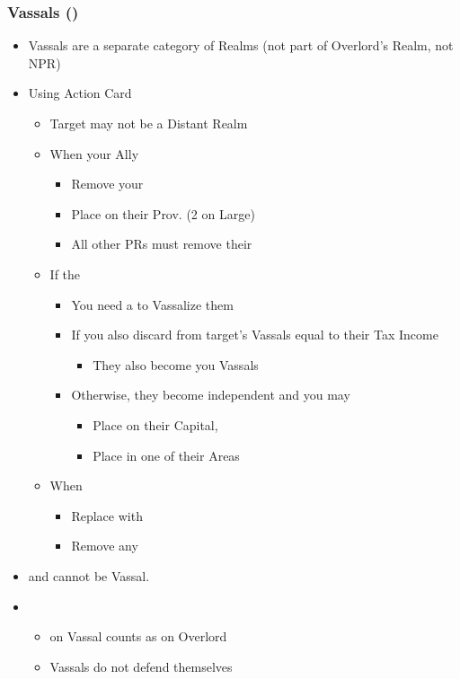 \documentclass[10pt]{article}
\begin{document}
\subsubsection*{Vassals (\vassal)}
\begin{itemize}
	\item Vassals are a separate category of Realms (not part of Overlord's Realm, not NPR)
	\item Using  Action Card
	\begin{itemize}
		\item Target may not be a Distant Realm
		\item When  your Ally
		\begin{itemize}
			\item Remove your \alliance
			\item Place \vassals on their Prov. (2 on Large)
			\item All other PRs must remove their \marriages
		\end{itemize}
		\item If the 
		\begin{itemize}
			\item You need a \marriage to Vassalize them
			\item If you also discard \influence from target's Vassals equal to their Tax Income
			\begin{itemize}
				\item They also become you Vassals
			\end{itemize}
			\item Otherwise, they become independent and you may
			\begin{itemize}
				\item Place \alliance on their Capital, 
				\item Place \claim in one of their Areas
			\end{itemize}
		\end{itemize}
		\item When 
		\begin{itemize}
			\item Replace \vassals with \towns
			\item Remove any \marriage
		\end{itemize}
	\end{itemize}
	\item {} and  cannot be Vassal.
	\item {}
	\begin{itemize}
		\item \claim on Vassal counts as \claim on Overlord
		\item Vassals do not defend themselves
	\end{itemize}
\end{itemize}
\end{document}
